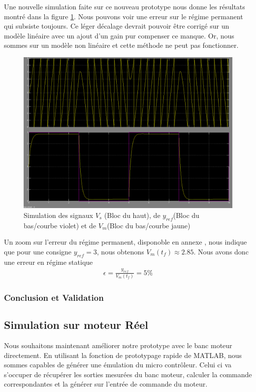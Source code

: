 		Une nouvelle simulation faite sur ce nouveau prototype nous donne les résultats montré dans la figure \ref{fig:SimuNL_ref_sortieVS_VM}. Nous pouvons voir une erreur sur le régime permanent qui subsiste toujours. Ce léger décalage devrait pouvoir être corrigé sur un modèle linéaire avec un ajout d'un gain pur compenser ce manque. Or, nous sommes sur un modèle non linéaire et cette méthode ne peut pas fonctionner.
		\begin{figure}[ht]
		\centering
		\includegraphics[width= \textwidth]{./IV/images/NL_Position--ref_sortie_RE.PNG}
		\caption{\label{fig:SimuNL_ref_sortieVS_VM} Simulation des signaux $V_s$ (Bloc du haut), de $y_{ref}$(Bloc du bas/courbe violet) et de $V_m$(Bloc du bas/courbe jaune)  }		
		\end{figure}
		Un zoom sur l'erreur du régime permanent, disponoble en annexe , nous indique que pour une consigne $y_{ref} = 3$, nous obtenons $V_m(t_f)\approx 2.85$. Nous avons donc une erreur en régime statique \begin{align*}
		\epsilon = \frac{y_{ref}}{V_m(t_f)} = 5\%
		\end{align*}
		\subsubsection{Conclusion et Validation}
	\subsection{Simulation sur moteur Réel}
		Nous souhaitons maintenant améliorer notre prototype avec le banc moteur directement. En utilisant la fonction de prototypage rapide de MATLAB, nous sommes capables de générer une émulation du micro contrôleur. Celui ci va s'occuper de récupérer les sorties mesurées du banc moteur, calculer la commande correspondantes et la générer sur l'entrée de commande du moteur. 

